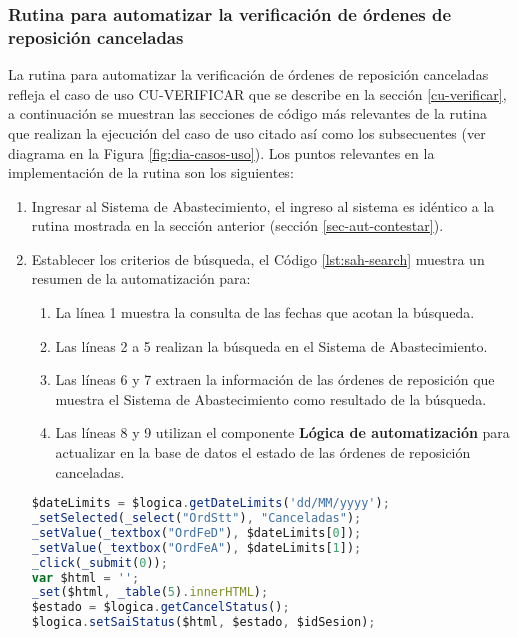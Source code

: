 \subsubsection{Rutina para automatizar la verificación de órdenes de reposición canceladas}
La rutina para automatizar la verificación de órdenes de reposición canceladas refleja el caso de uso  CU-VERIFICAR que se describe en la sección \ref{cu-verificar}, a continuación se muestran las secciones de código más relevantes de la rutina que realizan la ejecución del caso de uso citado así como los subsecuentes (ver diagrama en la Figura \ref{fig:dia-casos-uso}). Los puntos relevantes en la implementación de la rutina son los siguientes:
\begin{enumerate}
	\item Ingresar al Sistema de Abastecimiento, el ingreso al sistema es idéntico a la rutina mostrada en la sección anterior (sección \ref{sec-aut-contestar}).

	\item Establecer los criterios de búsqueda, el Código \ref{lst:sah-search} muestra un resumen de la automatización para:
	\begin{enumerate}
		\item La línea 1 muestra la consulta de las fechas que acotan la búsqueda.
		\item Las líneas 2 a 5 realizan la búsqueda en el Sistema de Abastecimiento.
		\item Las líneas 6 y 7 extraen la información de las órdenes de reposición que muestra el Sistema de Abastecimiento como resultado de la búsqueda.
		\item Las líneas 8 y 9 utilizan el componente \textbf{Lógica de automatización} para actualizar en la base de datos el estado de las órdenes de reposición canceladas.
	\end{enumerate}
	\begin{lstlisting}[language=Javascript, caption={Responder orden de reposición.}, captionpos=b, label={lst:sah-search}]
$dateLimits = $logica.getDateLimits('dd/MM/yyyy');
_setSelected(_select("OrdStt"), "Canceladas");
_setValue(_textbox("OrdFeD"), $dateLimits[0]);
_setValue(_textbox("OrdFeA"), $dateLimits[1]);
_click(_submit(0));
var $html = '';
_set($html, _table(5).innerHTML);
$estado = $logica.getCancelStatus();
$logica.setSaiStatus($html, $estado, $idSesion);
	\end{lstlisting}
\end{enumerate}

